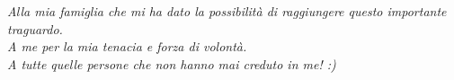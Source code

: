 \null{}
\begin{flushright}
	\textit{Alla mia famiglia che mi ha dato la possibilità di raggiungere questo importante traguardo.} \\
	\textit{A me per la mia tenacia e forza di volontà.} \\
	\textit{A tutte quelle persone che non hanno mai creduto in me! :)} \\
\end{flushright}
\null
